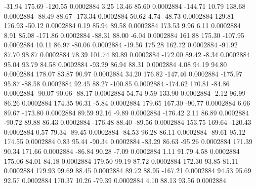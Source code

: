       -31.94      175.69     -120.55     0.0002884
        3.25       13.46       85.60     0.0002884
     -144.71       10.79      138.68     0.0002884
      -88.49       88.67     -173.34     0.0002884
       50.62        4.74      -48.73     0.0002884
      129.81      176.93      -50.12     0.0002884
        0.19       85.94       89.58     0.0002884
      173.53        9.96        6.11     0.0002884
        8.91       85.08     -171.86     0.0002884
      -88.31       88.00       -6.04     0.0002884
      161.88      175.30     -107.95     0.0002884
       10.11       86.97      -80.06     0.0002884
      -19.56      175.28      162.72     0.0002884
      -91.92       87.70       98.87     0.0002884
       78.39      101.74       89.89     0.0002884
     -172.00       89.42       -8.34     0.0002884
       95.04       93.79       84.58     0.0002884
      -93.29       86.94       88.31     0.0002884
        4.08       94.19       94.80     0.0002884
      178.07       83.87       90.97     0.0002884
       34.20      176.82     -147.46     0.0002884
     -175.97       95.87      -88.58     0.0002884
       92.45       88.27     -100.85     0.0002884
     -174.62      170.81      -84.86     0.0002884
      -90.07       90.06      -88.17     0.0002884
       54.74        9.59      133.90     0.0002884
       -2.12       96.99       86.26     0.0002884
      174.35       96.31       -5.84     0.0002884
      179.65      167.30      -90.77     0.0002884
        6.66       89.67     -173.80     0.0002884
       89.59       92.16       -9.89     0.0002884
     -176.42        2.11       86.89     0.0002884
      -90.72       89.88       86.43     0.0002884
     -176.48       88.40      -89.56     0.0002884
      153.75      169.64     -120.43     0.0002884
        0.57       79.34      -89.45     0.0002884
      -84.53       96.28       86.11     0.0002884
      -89.61       95.12      174.55     0.0002884
        0.83       95.44      -90.34     0.0002884
      -83.29       86.63      -95.26     0.0002884
      171.39       90.34      171.66     0.0002884
      -86.84       90.28       -7.09     0.0002884
        1.11       91.79        4.58     0.0002884
      175.06       84.01       84.18     0.0002884
      179.50       99.19       87.72     0.0002884
      172.30       93.85       81.11     0.0002884
      179.93       99.69       88.45     0.0002884
       89.72       88.95     -167.21     0.0002884
       94.53       95.69       92.57     0.0002884
      170.37       10.26      -79.39     0.0002884
        4.10       88.13       93.56     0.0002884
